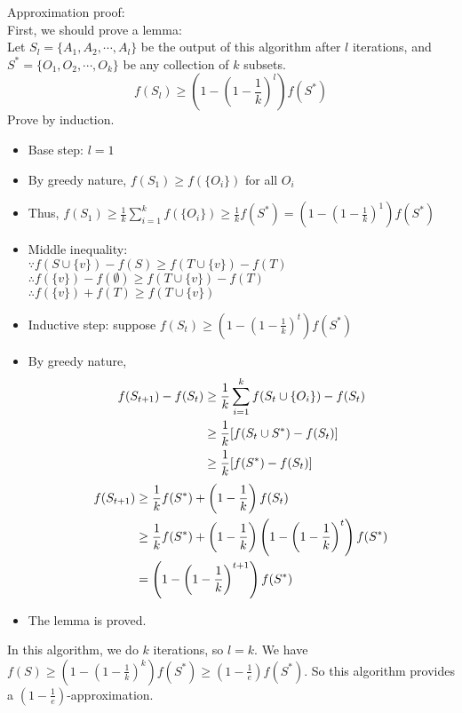 \documentclass{oxmathproblems}
\begin{document}
\begin{questions}
  Approximation proof:\\
  First, we should prove a lemma:\\
  Let $S_l = \{A_1, A_2, \cdots, A_l\}$ be the output of this algorithm after $l$ iterations, and $S^* = \{O_1, O_2, \cdots, O_k\}$ be any collection of $k$ subsets.
  $$f(S_l) \geq \left(1-\left( 1-\frac{1}{k} \right)^l \right)f(S^*)$$
  Prove by induction.\\
  \begin{itemize}
      \item Base step: $l = 1$
      \item By greedy nature, $f(S_1) \geq f(\{O_i\})$ for all $O_i$
      \item Thus, $f(S_1) \geq \frac{1}{k}\sum_{i = 1}^{k}f(\{O_i\}) \geq \frac{1}{k}f(S^*) = \left(1-\left( 1-\frac{1}{k} \right)^1 \right)f(S^*)$
      \item Middle inequality:\\
      $\because f(S\cup\{v\})-f(S)\geq f(T\cup\{v\})-f(T)$\\
      $\therefore f(\{v\})-f(\emptyset)\geq f(T\cup\{v\})-f(T)$\\
      $\therefore f(\{v\})+f(T)\geq f(T\cup\{v\})$
      \item Inductive step: suppose $f(S_t) \geq \left(1-\left( 1-\frac{1}{k} \right)^t \right)f(S^*)$
      \item By greedy nature,
    \begin{align}
      f(S_{t+1}) - f(S_t) &\geq \frac{1}{k} \sum_{i = 1}^{k}  f(S_t\cup\{O_i\}) - f(S_t) \notag\\
                          &\geq \frac{1}{k} [f(S_t \cup S^*) - f(S_t)] \notag\\
                          &\geq \frac{1}{k} [f(S^*) - f(S_t)] \notag
    \end{align}
    \begin{align}
    f(S_{t+1}) &\geq \frac{1}{k} f(S^*) + \left( 1 - \frac{1}{k} \right)f(S_t) \notag\\
               &\geq \frac{1}{k}f(S^*) + \left( 1 - \frac{1}{k} \right)\left(1-\left( 1-\frac{1}{k} \right)^t \right)f(S^*) \notag\\
               &= \left(1-\left(1-\frac{1}{k}\right)^{t+1}\right)f(S^*) \notag
    \end{align}
    \item The lemma is proved.
  \end{itemize}
  In this algorithm, we do $k$ iterations, so $l = k$. We have $f(S) \geq \left(1-\left( 1-\frac{1}{k} \right)^k \right)f(S^*) \geq \left(1-\frac{1}{e}\right)f(S^*)$.
  So this algorithm provides a $\left(1-\frac{1}{e}\right)$-approximation.


\end{questions}
\end{document}
